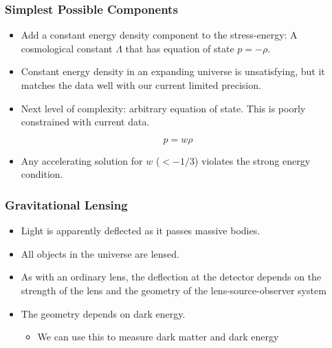 \documentclass{beamer}
\begin{document}
\frame
{
    \frametitle{Simplest Possible Components}

    \begin{itemize}

        \item Add a constant energy density component to the stress-energy:   A
            cosmological constant $\Lambda$ that has equation of
            state  $p=-\rho$.
            
        \item Constant energy density in an expanding universe is unsatisfying,
            but it matches the data well with our current limited precision.

        \item Next level of complexity: arbitrary equation of state.  This is
            poorly constrained with current data.

    \end{itemize}

    \begin{equation}
        p = w \rho
    \end{equation}

    \begin{itemize}
        \item Any accelerating solution for $w$ ($< - 1/3$) violates the strong energy condition.
    \end{itemize}

}



\frame
{
    \frametitle{Gravitational Lensing}

    \begin{itemize}

        \item Light is apparently deflected as it passes massive bodies.

        \item All objects in the universe are lensed.

        \item As with an ordinary lens, the deflection at the detector depends
            on the strength of the lens and the geometry of the
            lens-source-observer system

        \item The geometry depends on dark energy.
            
        \begin{itemize}
            \item We can use this to measure dark matter and dark energy
        \end{itemize}

    \end{itemize}

}
\end{document}
